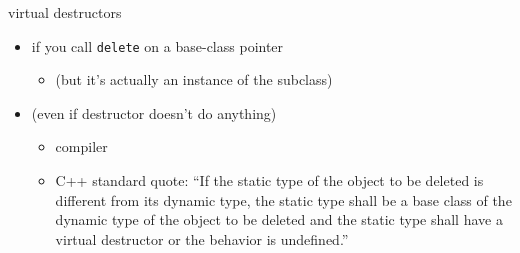 \begin{frame}{virtual destructors}
    \begin{itemize}
    \item {} if you call \texttt{delete} on a base-class pointer
        \begin{itemize}
        \item (but it's actually an instance of the subclass)
        \end{itemize}
    \item (even if destructor doesn't do anything)
        \begin{itemize}
            \item compiler 
            \item C++ standard quote: ``If the static type of the object to be deleted is different from its
dynamic type, the static type shall be a base class of the dynamic type of the object to be deleted and the
static type shall have a virtual destructor or the behavior is undefined.''
        \end{itemize}
    \end{itemize}
\end{frame}
